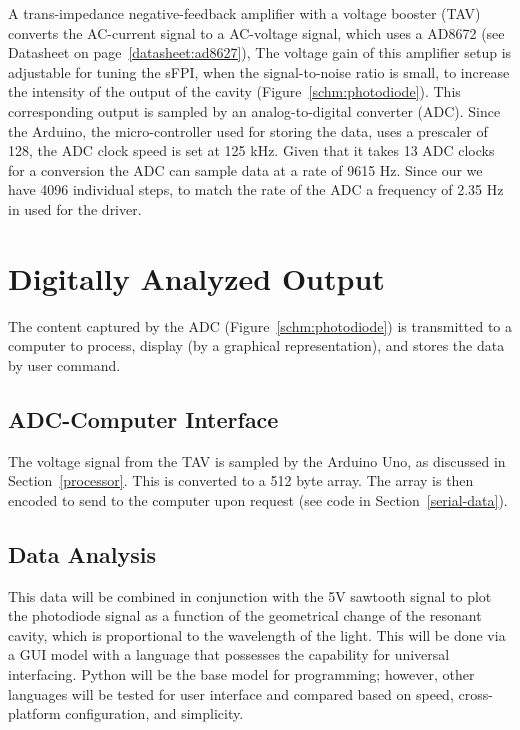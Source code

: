 \documentclass[12pt,journal]{IEEEtran}
\begin{document}
A trans-impedance negative-feedback amplifier with a voltage booster (TAV) converts the AC-current signal to a AC-voltage signal, which uses a AD8672 (see Datasheet on page~\ref{datasheet:ad8627}), The voltage gain of this amplifier setup is adjustable for tuning the sFPI, when the signal-to-noise ratio is small, to increase the intensity of the output of the cavity (Figure~\ref{schm:photodiode}). This corresponding output is sampled by an analog-to-digital converter (ADC). Since the Arduino, the micro-controller used for storing the data, uses a prescaler of 128, the ADC clock speed is set at 125 kHz. Given that it takes 13 ADC clocks for a conversion the ADC can sample data at a rate of 9615 Hz. Since our we have 4096 individual steps, to match the rate of the ADC a frequency of 2.35 Hz in used for the driver.    


\section{Digitally Analyzed Output}\label{digital-output}

The content captured by the ADC (Figure~\ref{schm:photodiode}) is transmitted to a computer to process, display (by a graphical representation), and stores the data by user command.  


\subsection{ADC-Computer Interface}

The voltage signal from the TAV is sampled by the Arduino Uno, as discussed in Section~\ref{processor}. This is converted to a 512 byte array. The array is then encoded to send to the computer upon request (see code in Section~\ref{serial-data}).


\subsection{Data Analysis}

This data will be combined in conjunction with the 5V sawtooth signal to plot the photodiode signal as a function of the geometrical change of the resonant cavity, which is proportional to the wavelength of the light. This will be done via a GUI model with a language that possesses the capability for universal interfacing. Python will be the base model for programming; however, other languages will be tested for user interface and compared based on speed, cross-platform configuration, and simplicity.
\end{document}
